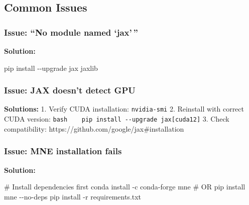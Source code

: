 \documentclass[
  11pt,
  letterpaper,
  oneside,
  openany]{book}
\newenvironment{Shaded}{\begin{snugshade}}{\end{snugshade}}
\newcommand{\AttributeTok}[1]{\textcolor[rgb]{0.40,0.45,0.13}{#1}}
\newcommand{\CommentTok}[1]{\textcolor[rgb]{0.37,0.37,0.37}{#1}}
\newcommand{\ExtensionTok}[1]{\textcolor[rgb]{0.00,0.23,0.31}{#1}}
\newcommand{\NormalTok}[1]{\textcolor[rgb]{0.00,0.23,0.31}{#1}}
\begin{document}

\subsection*{Common Issues}\label{common-issues}

\subsubsection*{Issue: ``No module named
`jax'\,''}\label{issue-no-module-named-jax}

\textbf{Solution:}

\begin{Shaded}
\begin{Highlighting}[]
\ExtensionTok{pip}\NormalTok{ install }\AttributeTok{{-}{-}upgrade}\NormalTok{ jax jaxlib}
\end{Highlighting}
\end{Shaded}

\subsubsection*{Issue: JAX doesn't detect
GPU}\label{issue-jax-doesnt-detect-gpu}

\textbf{Solutions:} 1. Verify CUDA installation: \texttt{nvidia-smi} 2.
Reinstall with correct CUDA version:
\texttt{bash\ \ \ \ pip\ install\ -\/-upgrade\ jax{[}cuda12{]}} 3. Check
compatibility: https://github.com/google/jax\#installation

\subsubsection*{Issue: MNE installation
fails}\label{issue-mne-installation-fails}

\textbf{Solution:}

\begin{Shaded}
\begin{Highlighting}[]
\CommentTok{\# Install dependencies first}
\ExtensionTok{conda}\NormalTok{ install }\AttributeTok{{-}c}\NormalTok{ conda{-}forge mne}
\CommentTok{\# OR}
\ExtensionTok{pip}\NormalTok{ install mne }\AttributeTok{{-}{-}no{-}deps}
\ExtensionTok{pip}\NormalTok{ install }\AttributeTok{{-}r}\NormalTok{ requirements.txt}
\end{Highlighting}
\end{Shaded}
\end{document}
